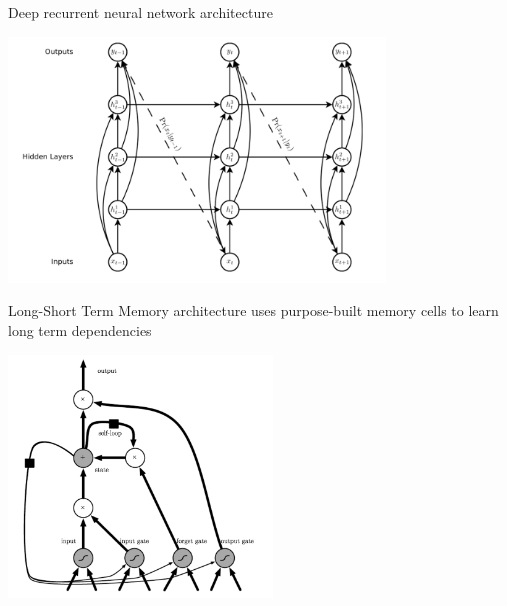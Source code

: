 \documentclass[envcountsect]{beamer}
\begin{document}
\begin{frame}{Deep recurrent neural network architecture}

\begin{center}
\includegraphics[width=10cm]{./imag/architecture.png}
\end{center}


\end{frame}

\begin{frame}{Long-Short Term Memory architecture uses purpose-built memory cells to learn long term dependencies}
\begin{center}
\includegraphics[width=7cm]{./imag/lstm.png}
\end{center}
\end{frame}
\end{document}
